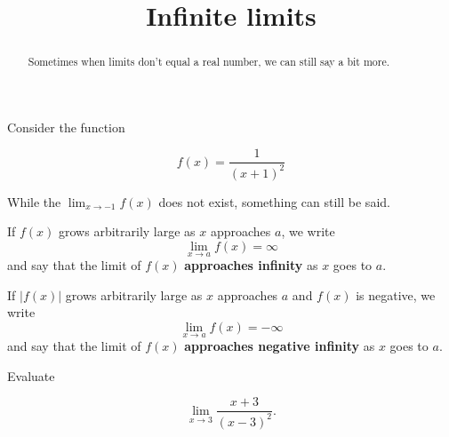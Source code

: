 \documentclass{ximera}
\title{Infinite limits}
\begin{document}
\begin{abstract}
  Sometimes when limits don't equal a real number, we can still say a
  bit more.
\end{abstract}
\maketitle

Consider the function

\[
f(x) = \frac{1}{(x+1)^2}
\]
\begin{image}
\end{image}
While the $\lim_{x\to -1} f(x)$ does not exist, something can still be
said.

\begin{definition}
If $f(x)$ grows arbitrarily large as $x$ approaches $a$, we write
\[
\lim_{x\to a} f(x) = \infty
\]
and say that the limit of $f(x)$ \textbf{approaches infinity} as $x$
goes to $a$.

If $|f(x)|$ grows arbitrarily large as $x$ approaches $a$ and $f(x)$ is
negative, we write
\[
\lim_{x\to a} f(x) = -\infty
\]
and say that the limit of $f(x)$ \textbf{approaches negative infinity}
as $x$ goes to $a$.
\end{definition}


\begin{question}
  Evaluate

  \[
  \lim_{x\to 3} \frac{x+3}{(x-3)^2}.
  \]
  
  \begin{multipleChoice}
  \end{multipleChoice}
\end{question}
\end{document}
